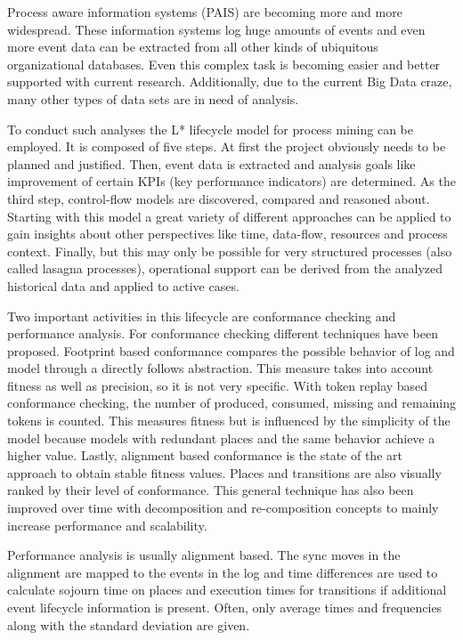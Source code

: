 Process aware information systems (PAIS) are becoming more and more widespread. These information systems log huge amounts of events and even more event data can be extracted from all other kinds of ubiquitous organizational databases. Even this complex task is becoming easier and better supported with current research. Additionally, due to the current Big Data craze, many other types of data sets are in need of analysis.

To conduct such analyses the L* lifecycle model for process mining \cite{van2011process} can be employed. It is composed of five steps. At first the project obviously needs to be planned and justified. Then, event data is extracted and analysis goals like improvement of certain KPIs (key performance indicators) are determined. As the third step, control-flow models are discovered, compared and reasoned about. Starting with this model a great variety of different approaches can be applied to gain insights about other perspectives like time, data-flow, resources and process context.
Finally, but this may only be possible for very structured processes (also called lasagna processes), operational support can be derived from the analyzed historical data and applied to active cases.

Two important activities in this lifecycle are conformance checking and performance analysis.
For conformance checking different techniques have been proposed. Footprint based conformance compares the possible behavior of log and model through a directly follows abstraction. This measure takes into account fitness as well as precision, so it is not very specific. With token replay based conformance checking, the number of produced, consumed, missing and remaining tokens is counted. This measures fitness but is influenced by the simplicity of the model because models with redundant places and the same behavior achieve a higher value. Lastly, alignment based conformance is the state of the art approach to obtain stable fitness values. Places and transitions are also visually ranked by their level of conformance. This general technique has also been improved over time with decomposition and re-composition concepts to mainly increase performance and scalability.

Performance analysis is usually alignment based. The sync moves in the alignment are mapped to the events in the log and time differences are used to calculate sojourn time on places and execution times for transitions if additional event lifecycle information is present. Often, only average times and frequencies along with the standard deviation are given.

